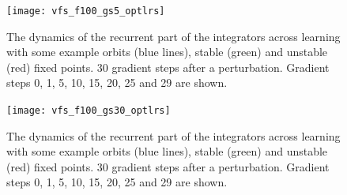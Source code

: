 \documentclass{article} %
\theoremstyle{definition}
\theoremstyle{remark}
\begin{document}
\begin{figure}[H]
     \centering
    \texttt{[image: vfs\_f100\_gs5\_optlrs]}
       \caption{The dynamics of the recurrent part of the integrators across learning with some example orbits (blue lines), stable (green) and unstable (red) fixed points. 30 gradient steps after a perturbation. Gradient steps 0, 1, 5, 10, 15, 20, 25 and 29 are shown. }
         \label{fig:vfs5}
\end{figure}

\begin{figure}[H]
     \centering
    \texttt{[image: vfs\_f100\_gs30\_optlrs]}
       \caption{The dynamics of the recurrent part of the integrators across learning with some example orbits (blue lines), stable (green) and unstable (red) fixed points. 30 gradient steps after a perturbation. Gradient steps 0, 1, 5, 10, 15, 20, 25 and 29 are shown. }
         \label{fig:vfs30}
\end{figure}
\end{document}
